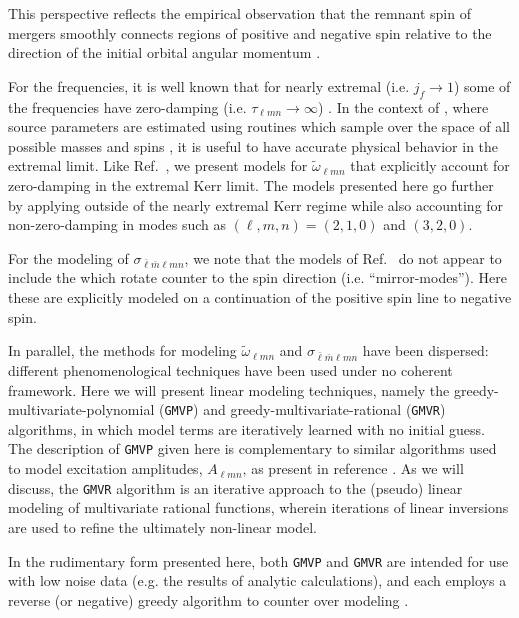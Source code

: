 \documentclass[twocolumn,aps,prd,floatfix,preprintnumbers,a4paper,nofootinbib,
superscriptaddress,10pt]{revtex4-1}
\newcommand{\cw}{\tilde{\omega}}
\def\jf{j_f}
\def\lmn{_{\ell m n}}
\def\LMlmn{_{\bar{\ell} \bar{m} \ell m n}}
\def\gmvp#1{greedy-multivariate-polynomial#1
  (\texttt{GMVP}#1)\gdef\gmvp{\texttt{GMVP}}}
\def\gmvr#1{greedy-multivariate-rational#1
  (\texttt{GMVR}#1)\gdef\gmvr{\texttt{GMVR}}}
\begin{document}
%
This perspective reflects the empirical observation that the remnant spin of \bbh{} mergers smoothly connects regions of positive and negative spin relative to the direction of the initial orbital angular momentum \cite{Husa:2015iqa,London:2018gaq}.
%
\par For the \qnm{} frequencies, it is well known that for nearly extremal  (i.e. $\jf \rightarrow 1$) some of the frequencies have zero-damping (i.e. $\tau\lmn \rightarrow \infty$) \cite{Yang:2012pj,Zimmerman:2015trm}.
%
In the context of \gw{} \da{}, where source parameters are estimated using routines which sample over the space of all possible \bh{} masses and spins \cite{TheLIGOScientific:2016wfe}, it is useful to have accurate physical behavior in the extremal limit.
%
Like Ref.~\cite{Cook:2014cta}, we present models for $\cw\lmn$ that explicitly account for zero-damping in the extremal Kerr limit.
%
The models presented here go further by applying outside of the nearly extremal Kerr regime while also accounting for non-zero-damping in modes such as $(\ell,m,n)=(2,1,0)$ and $(3,2,0)$\cite{Yang:2012pj}.
%
%
\par For the modeling of $\sigma\LMlmn$, we note that the models of Ref.~\cite{Berti:2014fga} do not appear to include the  which rotate counter to the \bh{} spin direction (i.e. ``mirror-modes'').
%
Here these \qnm{} are explicitly modeled on a continuation of the positive spin line to negative spin.
%
%
\par In parallel, the methods for modeling $\cw\lmn$ and $\sigma\LMlmn$ have been dispersed: different phenomenological techniques have been used under no coherent framework.
%
Here we will present linear modeling techniques, namely the \gmvp{} and \gmvr{} algorithms, in which model terms are iteratively learned with no initial guess.
%
The description of \gmvp{} given here is complementary to similar algorithms used to model \qnm{} excitation amplitudes, $A\lmn$, as present in reference \cite{Carullo:2018sfu,London:2018gaq,London:2014cma}.
%
As we will discuss, the \gmvr{} algorithm is an iterative approach to the (pseudo) linear modeling of multivariate rational functions, wherein iterations of linear inversions are used to refine the ultimately non-linear model.
%
\par In the rudimentary form presented here, both \gmvp{} and \gmvr{} are intended for use with low noise data (e.g. the results of analytic calculations), and each employs a reverse (or negative) greedy algorithm to counter over modeling \cite{Field:2011mf,Caudill:2011kv}.
\end{document}
